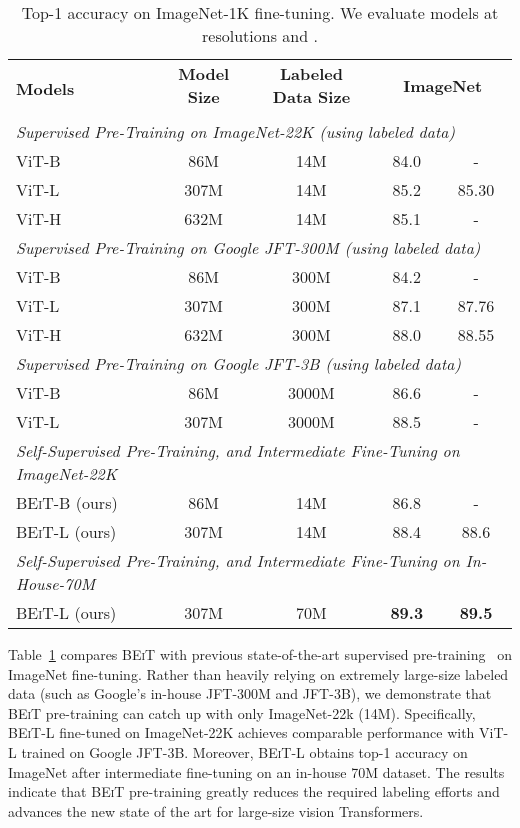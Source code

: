 \documentclass{article}
\newcommand\our{\textsc{BEiT}}
\begin{document}
\begin{table}[H]
\centering
\begin{tabular}{@{}lcccc}
\toprule
\multirow{2}{*}{\bf Models} & \multirowcell{2}{\bf Model \\ \bf Size} & \multirowcell{2}{\bf Labeled \\ \bf Data Size} &  \multicolumn{2}{c}{\bf ImageNet} \\
 & & &  &  \\ 
\midrule
\multicolumn{5}{l}{\textit{Supervised Pre-Training on ImageNet-22K (using labeled data)}} \\
ViT-B~\citep{vit} & 86M & 14M & 84.0 & - \\
ViT-L~\citep{vit} & 307M & 14M & 85.2 & 85.30 \\
ViT-H~\citep{vit} & 632M & 14M & 85.1 & - \\
\midrule
\multicolumn{5}{l}{\textit{Supervised Pre-Training on Google JFT-300M (using labeled data)}} \\
ViT-B~\citep{vit} & 86M & 300M & 84.2 & - \\
ViT-L~\citep{vit} & 307M & 300M & 87.1 & 87.76 \\
ViT-H~\citep{vit} & 632M & 300M & 88.0 & 88.55 \\
\midrule
\multicolumn{5}{l}{\textit{Supervised Pre-Training on Google JFT-3B (using labeled data)}} \\
ViT-B~\citep{scaling:vit} & 86M & 3000M & 86.6 & - \\
ViT-L~\citep{scaling:vit} & 307M & 3000M & 88.5 & - \\
\midrule
\multicolumn{5}{l}{\textit{Self-Supervised Pre-Training, and Intermediate Fine-Tuning on ImageNet-22K}} \\
\our{}-B (ours) & 86M & 14M & 86.8 & - \\
\our{}-L (ours) & 307M & 14M & 88.4 & 88.6 \\
\midrule
\multicolumn{5}{l}{\textit{Self-Supervised Pre-Training, and Intermediate Fine-Tuning on In-House-70M}} \\
\our{}-L (ours) & 307M & 70M & \bf 89.3 & \bf 89.5 \\
\bottomrule
\end{tabular}
\caption{Top-1 accuracy on ImageNet-1K fine-tuning.
We evaluate models at resolutions  and .
}
\label{tbl:supervised:pt:cls}
\end{table}


Table~\ref{tbl:supervised:pt:cls} compares \our{} with previous state-of-the-art supervised pre-training~\citep{vit,scaling:vit} on ImageNet fine-tuning.
Rather than heavily relying on extremely large-size labeled data (such as Google's in-house JFT-300M and JFT-3B), we demonstrate that \our{} pre-training can catch up with only ImageNet-22k (14M).
Specifically, \our{}-L fine-tuned on ImageNet-22K achieves comparable performance with ViT-L trained on Google JFT-3B.
Moreover, \our{}-L obtains  top-1 accuracy on ImageNet after intermediate fine-tuning on an in-house 70M dataset.
The results indicate that \our{} pre-training greatly reduces the required labeling efforts and advances the new state of the art for large-size vision Transformers.
\end{document}
